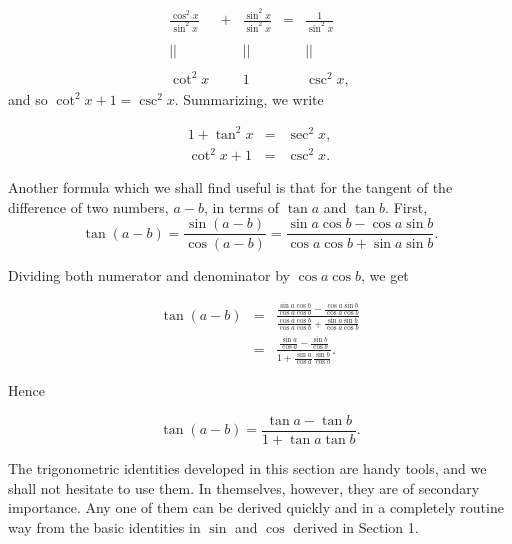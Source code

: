 $$
\begin{array}{ccccc}
\frac{\cos^{2}x}{\sin^{2} x} &+& \frac{ \sin^{2} x }{\sin ^{2} x} &=& \frac{1}{\sin^{2}{x}}\\ 
\\
            ||                            &  &              ||                              &  &                ||\\
\\
         \cot^{2} x                  &  &              1                              &  &           \csc^{2}x, 
\end{array}
$$
\noindent and so $\cot^{2}x + 1 = \csc^{2}x$. Summarizing, we write

\begin{theorem} %
\begin{eqnarray*}
1 +\tan^{2}x &=& \sec^{2}x, \\
\cot^{2}x + 1 &=& \csc^{2}x.
\end{eqnarray*}
\end{theorem}

Another formula which we shall find useful is that for the tangent of the difference of two numbers, $a - b$, in terms of $\tan a$ and $\tan b$. First,
$$
\tan (a - b) = \frac{\sin (a - b)}{\cos(a - b)} = \frac{\sin a \cos b - \cos a \sin b}{\cos a \cos b + \sin a \sin b}.
$$

Dividing both numerator and denominator by $\cos a \cos b$, we get


\begin{eqnarray*}
\tan (a - b) &=& \frac{\frac{\sin a \cos b}{\cos a \cos b} - \frac{\cos a \sin b}{\cos a \cos b}}{\frac{\cos a \cos b}{\cos a \cos b} + \frac{\sin a \sin b}{\cos a \cos b}}\\
&=& \frac{\frac{\sin a}{\cos a} - \frac{\sin b}{\cos b}}{ 1 + \frac{\sin a}{\cos a} \frac{\sin b}{\cos b}} .
\end{eqnarray*}

\noindent Hence

\begin{theorem} %
$$
\tan(a-b) = \frac{\tan a - \tan b}{1 + \tan a \tan b}.
$$
\end{theorem}

The trigonometric identities developed in this section are handy tools, and we shall not hesitate
to use them. In themselves, however, they are of secondary importance. Any one of them can be
derived quickly and in a completely routine way from the basic identities in $\sin$ and $\cos$ derived
in Section 1.

